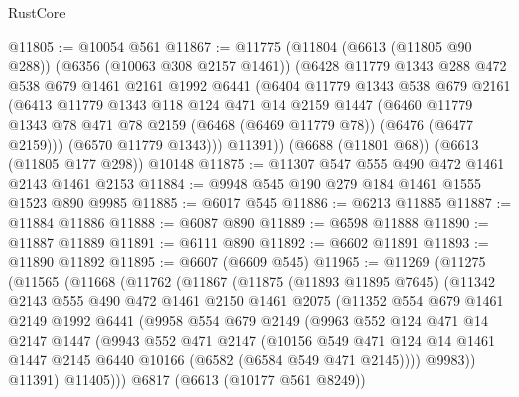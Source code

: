 \begin{lexlean}{RustCore}
\begin{coremodule}
@11805 := @10054 @561
@11867 := @11775
    (@11804
      (@6613 (@11805 @90 @288))
      (@6356 (@10063 @308 @2157 @1461))
      (@6428
        @11779
        @1343
        @288
        @472
        @538
        @679
        @1461
        @2161
        @1992
        @6441
        (@6404
          @11779
          @1343
          @538
          @679
          @2161
          (@6413
            @11779
            @1343
            @118
            @124
            @471
            @14
            @2159
            @1447
            (@6460 @11779 @1343 @78 @471 @78 @2159 (@6468 (@6469 @11779 @78)) (@6476 (@6477 @2159)))
            (@6570 @11779 @1343)))
        @11391))
    (@6688 (@11801 @68))
    (@6613 (@11805 @177 @298))
    @10148
@11875 := @11307 @547 @555 @490 @472 @1461 @2143 @1461 @2153
@11884 := @9948 @545 @190 @279 @184 @1461 @1555 @1523 @890 @9985
@11885 := @6017 @545
@11886 := @6213 @11885
@11887 := @11884 @11886
@11888 := @6087 @890
@11889 := @6598 @11888
@11890 := @11887 @11889
@11891 := @6111 @890
@11892 := @6602 @11891
@11893 := @11890 @11892
@11895 := @6607 (@6609 @545)
@11965 := @11269
    (@11275
      (@11565
        (@11668
          (@11762
            (@11867
              (@11875
                (@11893 @11895 @7645)
                (@11342
                  @2143
                  @555
                  @490
                  @472
                  @1461
                  @2150
                  @1461
                  @2075
                  (@11352
                    @554
                    @679
                    @1461
                    @2149
                    @1992
                    @6441
                    (@9958
                      @554
                      @679
                      @2149
                      (@9963
                        @552
                        @124
                        @471
                        @14
                        @2147
                        @1447
                        (@9943
                          @552
                          @471
                          @2147
                          (@10156
                            @549
                            @471
                            @124
                            @14
                            @1461
                            @1447
                            @2145
                            @6440
                            @10166
                            (@6582 (@6584 @549 @471 @2145))))
                        @9983))
                    @11391)
                  @11405)))
            @6817
            (@6613 (@10177 @561 @8249))

\end{coremodule}
\end{lexlean}
